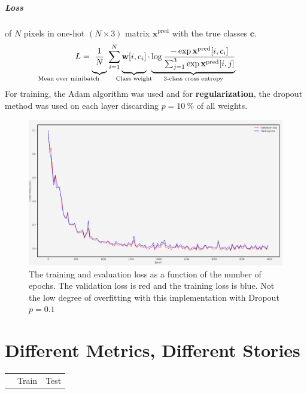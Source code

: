 \documentclass[
    ,title     = {{Image Segmentation for Smart Agriculture}}
    ,subject   = {{This is the subject of my work}}
    ,papersize = {{a1paper}}
    ,nocrop
]{dtuposter}
\begin{document}
\begin{dtupostercontent}
\subparagraph{Loss} of \(N\) pixels in one-hot \((N \times  3)\) matrix \(\mathbf x^\text{pred}\) with the true classes \(\mathbf c\).
\[
L = \underbrace{
\vphantom{\sum_{i}}
\frac 1 N}
_{\mathllap{\text{Mean over minibatch}}}
\sum_{\mathclap {i=1}}^{N}
\underbrace{ 
\vphantom{\sum_{i}}
\mathbf{w}[i, c_i]}
_{\mathclap{\text{Class weight}}}  
\cdot 
\underbrace{
\log 
\frac
{-\exp\mathbf x^\text{pred}[i, c_i]}
{\sum_{j=1}^{3}\exp\mathbf x^\text{pred}[i, j]}
}_{\mathclap{\text{3-class cross entropy}}}
\]
For training, the Adam algorithm was used and for \textbf{regularization}, the dropout method was used on each layer discarding \(p=10\ \%\)  of all weights.
\begin{figure}
	\begin{center}
			\includegraphics[width=\linewidth,origin=c]{loss3}
	\end{center}
	\caption{The training and evaluation loss as a function of the number of epochs. The validation loss is red and the training loss is blue. Not the low degree of overfitting with this implementation with Dropout \(p=0.1\)}\label{fig:example2}
\end{figure}



\section{Different Metrics, Different Stories}


\begin{table}
	\centering 
	\begin{tabular}{l|ccc|ccc|}
		
		\rule[-1ex]{0pt}{2.5ex}  & \multicolumn{3}{c|}{Train} &  \multicolumn{3}{c|}{Test} \\ 
		

\end{tabular}
\end{table}
\end{dtupostercontent}
\end{document}
